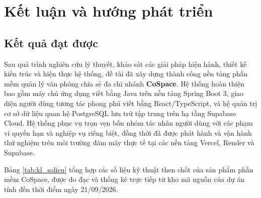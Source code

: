 \chapter{Kết luận và hướng phát triển}
\label{ch:ketluan}


\section{Kết quả đạt được}
\label{sec:kl_ketqua}

Sau quá trình nghiên cứu lý thuyết, khảo sát các giải pháp hiện hành, thiết kế kiến trúc và hiện thực hệ thống, đề tài đã xây dựng thành công nền tảng phần mềm quản lý văn phòng chia sẻ đa chi nhánh \textbf{CoSpace}. Hệ thống hoàn thiện bao gồm máy chủ ứng dụng viết bằng Java trên nền tảng Spring Boot 3, giao diện người dùng tương tác phong phú viết bằng React/TypeScript, và hệ quản trị cơ sở dữ liệu quan hệ PostgreSQL lưu trữ tập trung trên hạ tầng Supabase Cloud. Hệ thống phục vụ trọn vẹn bốn nhóm tác nhân người dùng với các phạm vi quyền hạn và nghiệp vụ riêng biệt, đồng thời đã được phát hành và vận hành thử nghiệm trên môi trường đám mây thực tế tại các nền tảng Vercel, Render và Supabase.

Bảng \ref{tab:kl_solieu} tổng hợp các số liệu kỹ thuật then chốt của sản phẩm phần mềm CoSpace, được đo đạc và thống kê trực tiếp từ kho mã nguồn của dự án tính đến thời điểm ngày 21/09/2026.


